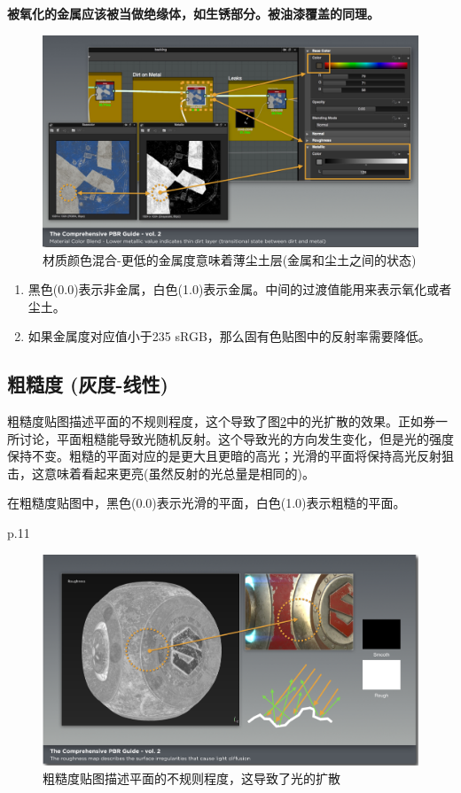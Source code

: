 \textbf{被氧化的金属应该被当做绝缘体，如生锈部分。被油漆覆盖的同理。}

\begin{figure}[ht]
    \centering
	\includegraphics[width=\textwidth]{images/chap2_15.png}
	\caption{材质颜色混合-更低的金属度意味着薄尘土层(金属和尘土之间的状态)}
    \label{fig:chap2_15}
\end{figure}

\begin{enumerate}
\item 黑色(0.0)表示非金属，白色(1.0)表示金属。中间的过渡值能用来表示氧化或者尘土。
\item 如果金属度对应值小于235 sRGB，那么固有色贴图中的反射率需要降低。
\end{enumerate}

\subsection{粗糙度 (灰度-线性)}

粗糙度贴图描述平面的不规则程度，这个导致了图\ref{fig:chap2_16}中的光扩散的效果。正如券一所讨论，平面粗糙能导致光随机反射。这个导致光的方向发生变化，但是光的强度保持不变。粗糙的平面对应的是更大且更暗的高光；光滑的平面将保持高光反射狙击，这意味着看起来更亮(虽然反射的光总量是相同的)。

在粗糙度贴图中，黑色(0.0)表示光滑的平面，白色(1.0)表示粗糙的平面。

p.11

\begin{figure}[ht]
    \centering
	\includegraphics[width=\textwidth]{images/chap2_16.png}
	\caption{粗糙度贴图描述平面的不规则程度，这导致了光的扩散}
    \label{fig:chap2_16}
\end{figure}

